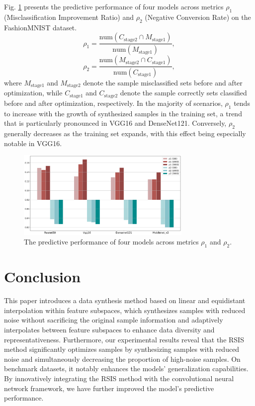 \documentclass[lettersize,journal]{IEEEtran}
\begin{document}
Fig. \ref{Fig9} presents the predictive performance of four 
models across metrics $\rho_1$ (Misclassification Improvement 
Ratio) and $\rho_2$ (Negative Conversion Rate) on the 
FashionMNIST dataset.
\begin{equation}
\label{eq21}
\rho_1=\dfrac{\text{num}(C_{\text{stage2}}\cap  
M_{\text{stage1}})}{\text{num}(M_{\text{stage1}})},
\end{equation}
\begin{equation}
\label{eq22}
\rho_2=\dfrac{\text{num}(M_{\text{stage2}}\cap C_{\text{stage1}})}
{\text{num}(C_{\text{stage1}})},
\end{equation}
where $M_{\text{stage1}}$ and $M_{\text{stage2}}$ denote the 
sample misclassified sets before and after optimization, while 
$C_{\text{stage1}}$ and $C_{\text{stage2}}$ denote the sample 
correctly sets classified before and after optimization, 
respectively.  In the majority of scenarios, $\rho_1$ tends to 
increase with the growth of synthesized samples in the training 
set, a trend that is particularly pronounced in VGG16 and 
DenseNet121. Conversely, $\rho_2$ generally decreases as the 
training set expands, with this effect being especially notable 
in VGG16. 

\begin{figure}[!t]
  \centering
  \includegraphics[width=3.3in]{Fig9.png}
  \caption{The predictive performance of four models across metrics $\rho_1$ and $\rho_2$.}
  \label{Fig9}
\end{figure}


\section{Conclusion}
This paper introduces a data synthesis method based on linear and 
equidistant interpolation within feature subspaces, which 
synthesizes samples with reduced noise without sacrificing 
the original sample information and adaptively interpolates 
between feature subspaces to enhance data diversity and 
representativeness. Furthermore, our experimental results reveal 
that the RSIS method significantly optimizes samples by 
synthesizing samples with reduced noise and simultaneously 
decreasing the proportion of high-noise samples. On benchmark 
datasets, it notably enhances the models' generalization 
capabilities. By innovatively integrating the RSIS method with 
the convolutional neural network framework, we have further 
improved the model's predictive performance.
\end{document}
